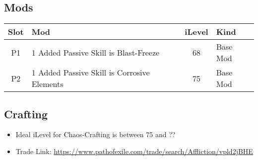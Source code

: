 \subsection{Mods}
\begin{tabular}{|c|l|c|l|}
	\hline
	Slot&Mod&iLevel&Kind\\\hline
	P1& 1 Added Passive Skill is Blast-Freeze&68& Base Mod \\\hline
	P2& 1 Added Passive Skill is Corrosive Elements&75& Base Mod \\\hline
\end{tabular}

\subsection{Crafting}
\begin{itemize}
	\item Ideal iLevel for Chaos-Crafting is between 75 and ??
	\item Trade Link: \url{https://www.pathofexile.com/trade/search/Affliction/vpld2jBHE}
\end{itemize}